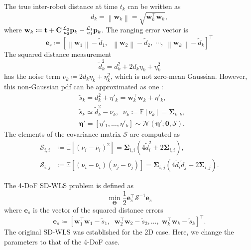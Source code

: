 \documentclass[journal]{IEEEtran}
\newcommand{\norm}[1]{\left\lVert#1\right\rVert}
\def\CovMatR{\mathbf{\Sigma}}
\def\CovMatS{\mathcal{S}}
\def\LocPosHost{\prescript{\mathcal{L}_1}{a_1}{\mathbf{p}}} %
\def\AlignedPosTarg{\mathbf{C} \prescript{\mathcal{L}_2}{a_2}{\mathbf{p}}} %
\def\StateVector{\mathbf{\Theta}}
\begin{document}
The true inter-robot distance at time $t_k$ can be written as
\begin{equation}
    d_k = \norm{\mathbf{w}_k} = \sqrt{\mathbf{w}_k^\top \mathbf{w}_k},
\end{equation}
where $\mathbf{w}_k \coloneqq \mathbf{t} + \AlignedPosTarg_k - \LocPosHost_k$. The ranging error vector is
\begin{equation}
    \mathbf{e}_r \coloneqq \left[
        \norm{\mathbf{w}_1} - \tilde{d}_1,\;\;
        \norm{\mathbf{w}_2} - \tilde{d}_2,\;
        \cdots,\;
        \norm{\mathbf{w}_k} - \tilde{d}_k
    \right]^\top
\end{equation}
The squared distance measurement 
\begin{equation}
    \tilde{d}_k^2 = d_k^2 + 2 d_k \eta_k + \eta_k^2
\end{equation}
has the noise term $\nu_k \coloneqq 2 d_k \eta_k + \eta_k^2$, which is not zero-mean Gaussian. However, this non-Gaussian pdf can be approximated as one \cite{trawny2010relplanar}:
\begin{equation}
\begin{aligned}
    &\tilde{s}_k = d_k^2 + \eta'_k = \mathbf{w}_k^\top \mathbf{w}_k + \eta'_k,\\
    &\tilde{s}_k \simeq \tilde{d}_k^2 - \bar{\nu}_k, \;\; \bar{\nu}_k \coloneqq \mathbb{E}[\nu_k] = \CovMatR_{k,k},\\
    &\bm{\eta}' = [\eta'_1, \dots, \eta'_k] \sim \mathcal{N}(\bm{\eta}'; \mathbf{0}, \CovMatS).
\end{aligned}
\end{equation}
The elements of the covariance matrix $\CovMatS$ are computed as
\begin{equation}
\begin{aligned} \label{eq:CovSigmaS}
    \CovMatS_{i,i} &\coloneqq 
    \mathbb{E}[(\nu_i - \bar{\nu}_i)^2] = \CovMatR_{i,i} 
    \left(4 \tilde{d}_i^2 + 2 \CovMatR_{i,i}\right),\\
    \CovMatS_{i,j} &\coloneqq 
    \mathbb{E}[(\nu_i - \bar{\nu}_i)(\nu_j - \bar{\nu}_j)] 
    = \CovMatR_{i,j} 
    \left(4 \tilde{d}_i \tilde{d}_j  + 2\CovMatR_{i,j}\right).
\end{aligned}
\end{equation}

The 4-DoF SD-WLS problem is defined as
\begin{equation}\label{eq:prob_SD_WLS}
    \min\limits_{\StateVector} \frac{1}{2}
        \mathbf{e}_s^\top
        \CovMatS^{-1}
        \mathbf{e}_s
\end{equation}
where $\mathbf{e}_s$ is the vector of the squared distance errors
\begin{equation} \label{eq:e_s}
    \mathbf{e}_s \coloneqq [
    \mathbf{w}_1^\top \mathbf{w}_1 - \tilde{s}_1, \;\;
    \mathbf{w}_2^\top \mathbf{w}_2 - \tilde{s}_2, \dots , \;
    \mathbf{w}_k^\top \mathbf{w}_k - \tilde{s}_k]^\top.
\end{equation}
The original SD-WLS \cite{trawny2010relplanar} was established for the 2D case. Here, we change the parameters to that of the 4-DoF case.
\end{document}
